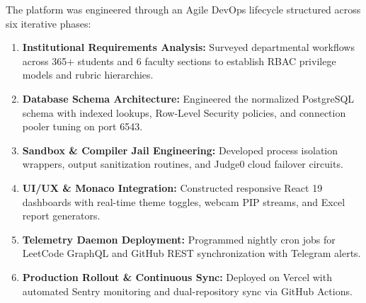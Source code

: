 {The platform was engineered through an Agile DevOps lifecycle structured across six iterative phases:
\begin{enumerate}[noitemsep,topsep=2pt,leftmargin=*]
  \item \textbf{Institutional Requirements Analysis:} Surveyed departmental workflows across 365+ students and 6 faculty sections to establish RBAC privilege models and rubric hierarchies.
  \item \textbf{Database Schema Architecture:} Engineered the normalized PostgreSQL schema with indexed lookups, Row-Level Security policies, and connection pooler tuning on port 6543.
  \item \textbf{Sandbox \& Compiler Jail Engineering:} Developed process isolation wrappers, output sanitization routines, and Judge0 cloud failover circuits.
  \item \textbf{UI/UX \& Monaco Integration:} Constructed responsive React 19 dashboards with real-time theme toggles, webcam PIP streams, and Excel report generators.
  \item \textbf{Telemetry Daemon Deployment:} Programmed nightly cron jobs for LeetCode GraphQL and GitHub REST synchronization with Telegram alerts.
  \item \textbf{Production Rollout \& Continuous Sync:} Deployed on Vercel with automated Sentry monitoring and dual-repository sync via GitHub Actions.
\end{enumerate}\par}
\newpage
